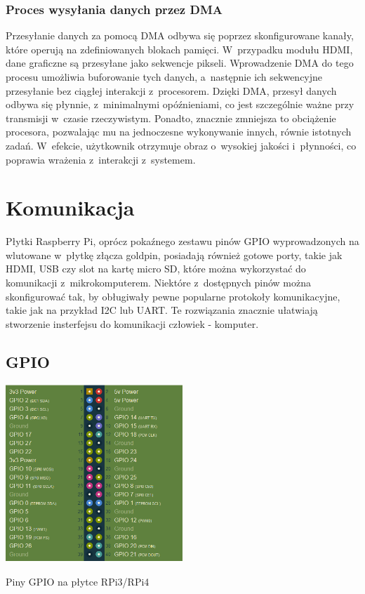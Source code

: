 \documentclass[shortabstract]{iithesis}
\begin{document}
\subsection{Proces wysyłania danych przez DMA}
Przesyłanie danych za pomocą DMA odbywa się poprzez skonfigurowane kanały, które operują na zdefiniowanych blokach pamięci. W~przypadku modułu HDMI, dane graficzne są przesyłane jako sekwencje pikseli. Wprowadzenie DMA do tego procesu umożliwia buforowanie tych danych, a~następnie ich sekwencyjne przesyłanie bez ciągłej interakcji z~procesorem. Dzięki DMA, przesył danych odbywa się płynnie, z~minimalnymi opóźnieniami, co jest szczególnie ważne przy transmisji w~czasie rzeczywistym. Ponadto, znacznie zmniejsza to obciążenie procesora, pozwalając mu na jednoczesne wykonywanie innych, równie istotnych zadań. W~efekcie, użytkownik otrzymuje obraz o~wysokiej jakości i~płynności, co poprawia wrażenia z~interakcji z~systemem.


\chapter{Komunikacja}
Płytki Raspberry Pi, oprócz pokaźnego zestawu pinów GPIO wyprowadzonych na wlutowane w~płytkę złącza goldpin, posiadają również gotowe porty, takie jak HDMI, USB czy slot na kartę micro SD, które można wykorzystać do komunikacji z~mikrokomputerem. Niektóre z~dostępnych pinów można skonfigurować tak, by obługiwały pewne popularne protokoły komunikacyjne, takie jak na przykład I2C lub UART. Te rozwiązania znacznie ułatwiają stworzenie insterfejsu do komunikacji człowiek - komputer.

\section{GPIO}
\begingroup
\centering
\includegraphics[width=0.5\textwidth]{gpio.png}
\captionsetup{type=figure}
\caption{Piny GPIO na płytce RPi3/RPi4}
\endgroup
\end{document}
